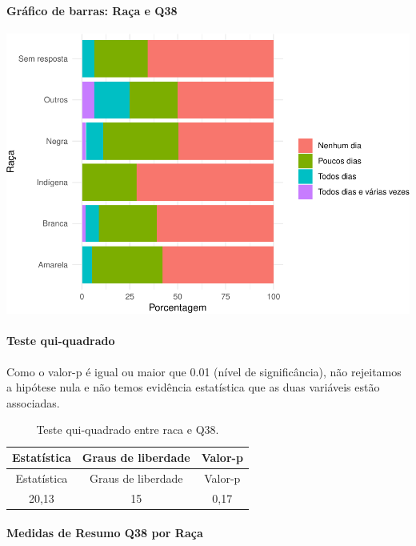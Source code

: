 \documentclass[]{article}
\let\oldparagraph\paragraph
\renewcommand{\paragraph}[1]{\oldparagraph{#1}\mbox{}}
\begin{document}
\hypertarget{gruxe1fico-de-barras-rauxe7a-e-q38}{%
\paragraph{Gráfico de barras: Raça e Q38}\label{gruxe1fico-de-barras-rauxe7a-e-q38}}

\begin{center}\includegraphics[width=0.75\linewidth]{relatorio_covid19_files/figure-latex/unnamed-chunk-1460-1} \end{center}

\hypertarget{teste-qui-quadrado-125}{%
\paragraph{Teste qui-quadrado}\label{teste-qui-quadrado-125}}

Como o valor-p é igual ou maior que 0.01 (nível de significância), não rejeitamos a hipótese nula e não temos evidência estatística que as duas variáveis estão associadas.

\begin{longtable}[]{@{}ccc@{}}
\caption{\label{tab:unnamed-chunk-1462}Teste qui-quadrado entre raca e Q38.}\tabularnewline
\toprule
Estatística & Graus de liberdade & Valor-p\tabularnewline
\midrule
\endfirsthead
\toprule
Estatística & Graus de liberdade & Valor-p\tabularnewline
\midrule
\endhead
20,13 & 15 & 0,17\tabularnewline
\bottomrule
\end{longtable}

\cleardoublepage

\hypertarget{medidas-de-resumo-q38-por-rauxe7a}{%
\paragraph{Medidas de Resumo Q38 por Raça}\label{medidas-de-resumo-q38-por-rauxe7a}}
\end{document}

